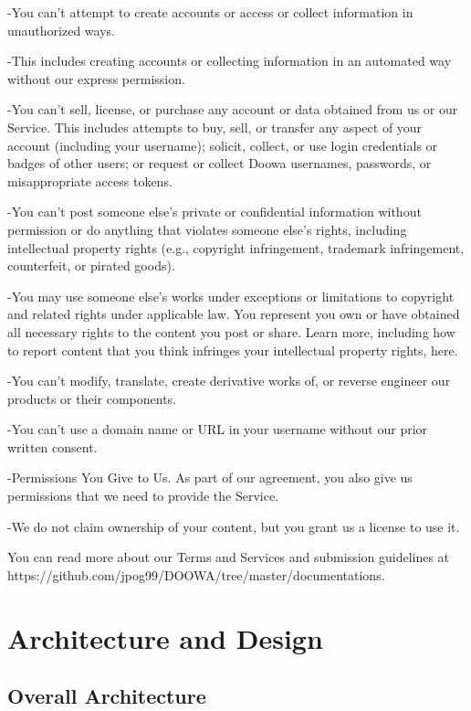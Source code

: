 \documentclass[conference]{IEEEtran}
\begin{document}
-You can't attempt to create accounts or access or collect information in unauthorized ways.

-This includes creating accounts or collecting information in an automated way without our express permission.

-You can’t sell, license, or purchase any account or data obtained from us or our Service. This includes attempts to buy, sell, or transfer any aspect of your account (including your username); solicit, collect, or use login credentials or badges of other users; or request or collect Doowa usernames, passwords, or misappropriate access tokens.

-You can't post someone else’s private or confidential information without permission or do anything that violates someone else's rights, including intellectual property rights (e.g., copyright infringement, trademark infringement, counterfeit, or pirated goods).

-You may use someone else's works under exceptions or limitations to copyright and related rights under applicable law. You represent you own or have obtained all necessary rights to the content you post or share. Learn more, including how to report content that you think infringes your intellectual property rights, here.

-You can’t modify, translate, create derivative works of, or reverse engineer our products or their components.

-You can't use a domain name or URL in your username without our prior written consent.

-Permissions You Give to Us. As part of our agreement, you also give us permissions that we need to provide the Service.

-We do not claim ownership of your content, but you grant us a license to use it.

You can read more about our Terms and Services and submission guidelines at \\
https://github.com/jpog99/DOOWA/tree/master/documentations.\\
\newpage

\section{Architecture and Design}

\subsection{Overall Architecture}
\end{document}
